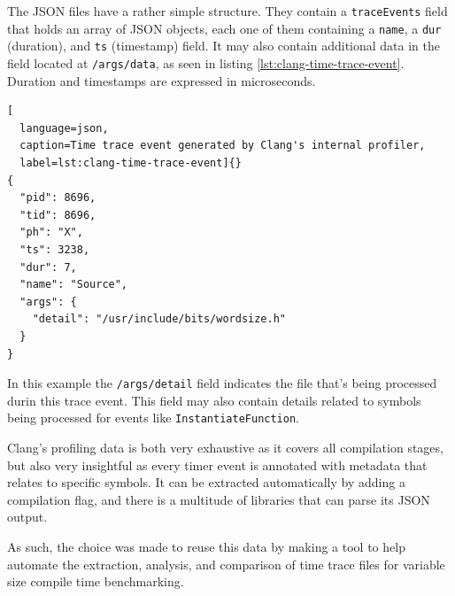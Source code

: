 \documentclass[../main]{subfiles}
\begin{document}
The JSON files have a rather simple structure. They contain a
\lstinline{traceEvents} field that holds an array of JSON objects, each one of
them containing a \lstinline{name}, a \lstinline{dur} (duration), and
\lstinline{ts} (timestamp) field. It may also contain additional data in the
field located at \lstinline{/args/data}, as seen in listing
\ref{lst:clang-time-trace-event}. Duration and timestamps are expressed in
microseconds.

\begin{lstlisting}[
  language=json,
  caption=Time trace event generated by Clang's internal profiler,
  label=lst:clang-time-trace-event]{}
{
  "pid": 8696,
  "tid": 8696,
  "ph": "X",
  "ts": 3238,
  "dur": 7,
  "name": "Source",
  "args": {
    "detail": "/usr/include/bits/wordsize.h"
  }
}
\end{lstlisting}

In this example the \lstinline{/args/detail} field indicates the file that's
being processed durin this trace event. This field may also contain details
related to symbols being processed for events like
\lstinline{InstantiateFunction}.

Clang's profiling data is both very exhaustive as it covers
all compilation stages, but also very insightful as every timer event is
annotated with metadata that relates to specific \cpp symbols.
It can be extracted automatically by adding a compilation flag,
and there is a multitude of libraries that can parse its JSON output.

As such, the choice was made to reuse this data by making a tool to help
automate the extraction, analysis, and comparison of time trace files
for variable size compile time benchmarking.
\end{document}
